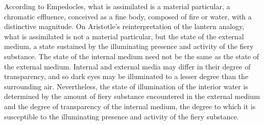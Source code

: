 According to Empedocles, what is assimilated is a material particular, a chromatic effluence, conceived as a fine body, composed of fire or water, with a distinctive magnitude. On Aristotle's reinterpretation of the lantern analogy, what is assimilated is not a material particular, but the state of the external medium, a state sustained by the illuminating presence and activity of the fiery substance. The state of the internal medium need not be the same as the state of the external medium. Internal and external media may differ in their degree of transparency, and so dark eyes may be illuminated to a lesser degree than the surrounding air. Nevertheless, the state of illumination of the interior water is determined by the amount of fiery substance encountered in the external medium and the degree of transparency of the internal medium, the degree to which it is susceptible to the illuminating presence and activity of the fiery substance. 

